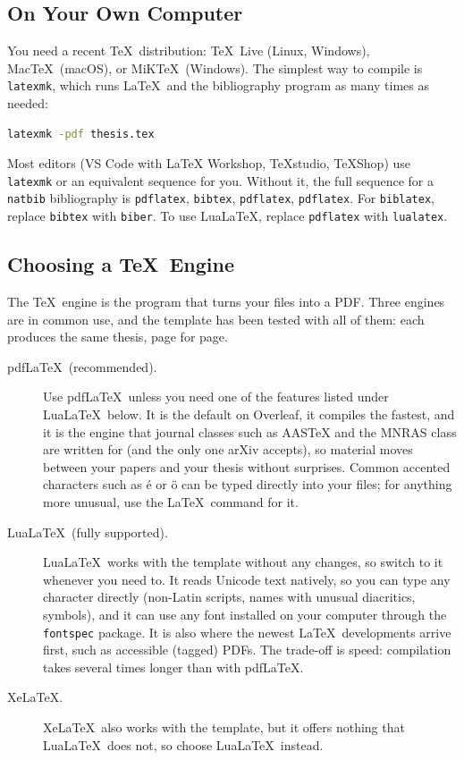 \subsection{On Your Own Computer}

You need a recent \TeX\ distribution: \TeX\ Live (Linux, Windows), Mac\TeX\ (macOS), or MiK\TeX\ (Windows). The simplest way to compile is \texttt{latexmk}, which runs \LaTeX\ and the bibliography program as many times as needed:
\begin{lstlisting}[language=bash]
latexmk -pdf thesis.tex
\end{lstlisting}
Most editors (VS Code with LaTeX Workshop, TeXstudio, TeXShop) use \texttt{latexmk} or an equivalent sequence for you. Without it, the full sequence for a \texttt{natbib} bibliography is \texttt{pdflatex}, \texttt{bibtex}, \texttt{pdflatex}, \texttt{pdflatex}. For \texttt{biblatex}, replace \texttt{bibtex} with \texttt{biber}. To use Lua\LaTeX, replace \texttt{pdflatex} with \texttt{lualatex}.

\subsection{Choosing a \TeX\ Engine}

\label{sec:engines}

The \TeX\ engine is the program that turns your  files into a PDF. Three engines are in common use, and the template has been tested with all of them: each produces the same thesis, page for page.

\begin{description}
    \item[pdf\LaTeX\ (recommended).] Use pdf\LaTeX\ unless you need one of the features listed under Lua\LaTeX\ below. It is the default on Overleaf, it compiles the fastest, and it is the engine that journal classes such as AASTeX and the MNRAS class are written for (and the only one arXiv accepts), so material moves between your papers and your thesis without surprises. Common accented characters such as \'e or \"o can be typed directly into your files; for anything more unusual, use the \LaTeX\ command for it.
    \item[Lua\LaTeX\ (fully supported).] Lua\LaTeX\ works with the template without any changes, so switch to it whenever you need to. It reads Unicode text natively, so you can type any character directly (non-Latin scripts, names with unusual diacritics, symbols), and it can use any font installed on your computer through the \texttt{fontspec} package. It is also where the newest \LaTeX\ developments arrive first, such as accessible (tagged) PDFs. The trade-off is speed: compilation takes several times longer than with pdf\LaTeX.
    \item[Xe\LaTeX.] Xe\LaTeX\ also works with the template, but it offers nothing that Lua\LaTeX\ does not, so choose Lua\LaTeX\ instead.
\end{description}

